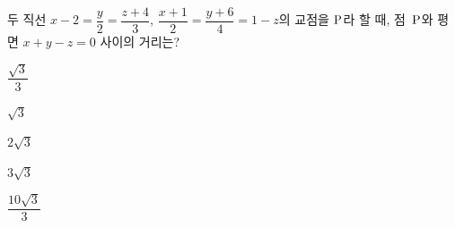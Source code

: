 두 직선 $x-2=\dfrac{y}{2}=\dfrac{z+4}{3}$, $\dfrac{x+1}{2}=\dfrac{y+6}{4}=1-z$의 교점을 $\mathrm{P}$라 할 때, 점~$\mathrm{P}$와 평면 $x+y-z=0$ 사이의 거리는?
\begin{choices32}{\rule[-3ex]{0pt}{8ex}$\dfrac{\sqrt{3}}{3}$}{\rule[-3ex]{0pt}{8ex}$\sqrt{3}$}{\rule[-3ex]{0pt}{8ex}$2\sqrt{3}$}{\rule[-3ex]{0pt}{8ex}$3\sqrt{3}$}{\rule[-3ex]{0pt}{8ex}$\dfrac{10\sqrt{3}}{3}$}\end{choices32}
